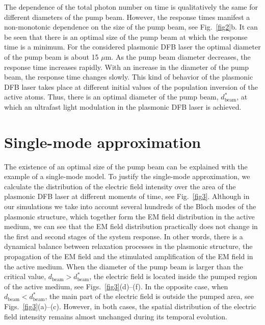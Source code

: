 \documentclass[aps,pra,amsmath,amssymb,onecolumn,superscriptaddress,showpacs,floatfix,]{revtex4-1}
\begin{document}
The dependence of the total photon number on time is qualitatively the same for different diameters of the pump beam.
However, the response times manifest a non-monotonic dependence on the size of the pump beam, see Fig.~\ref{fig2}b.
It can be seen that there is an optimal size of the pump beam at which the response time is a minimum.
For the considered plasmonic DFB laser the optimal diameter of the pump beam is about 15 $\mu$m.
As the pump beam diameter decreases, the response time increases rapidly.
With an increase in the diameter of the pump beam, the response time changes slowly.
This kind of behavior of the plasmonic DFB laser takes place at different initial values of the population inversion of the active atoms.
Thus, there is an optimal diameter of the pump beam, $d_{\text{beam}}^*$, at which an ultrafast light modulation in the plasmonic DFB laser is achieved.

\section*{Single-mode approximation}

The existence of an optimal size of the pump beam can be explained with the example of a single-mode model. To justify the single-mode approximation, we calculate the distribution of the electric field intensity over the area of the plasmonic DFB laser at different moments of time, see Fig.~\ref{fig3}.
Although in our simulations we take into account several hundreds of the Bloch modes of the plasmonic structure, which together form the EM field distribution in the active medium, we can see that the EM field distribution practically does not change in the first and second stages of the system response. In other words, there is a dynamical balance between relaxation processes in the plasmonic structure, the propagation of the EM field and the stimulated amplification of the EM field in the active medium. When the diameter of the pump beam is larger than the critical value, $d_{\text{beam}} > d_{\text{beam}}^*$, the electric field is located inside the pumped region of the active medium, see Figs.~\ref{fig3}(d)--(f).
In the opposite case, when $d_{\text{beam}} < d_{\text{beam}}^*$, the main part of the electric field is outside the pumped area, see Figs.~\ref{fig3}(a)--(c).
However, in both cases, the spatial distribution of the electric field intensity remains almost unchanged during its temporal evolution. 
\end{document}
